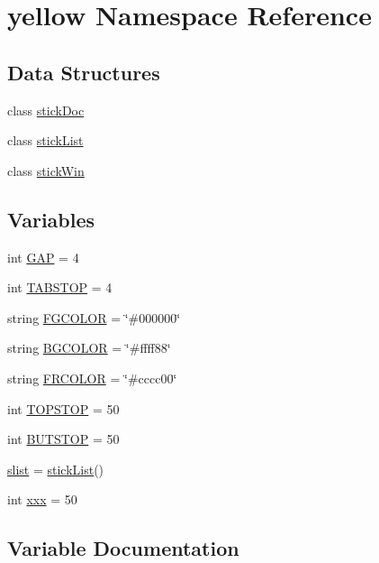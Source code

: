 \hypertarget{namespaceyellow}{}\section{yellow Namespace Reference}
\label{namespaceyellow}
\subsection*{Data Structures}
\begin{DoxyCompactItemize}
\item 
class \hyperlink{classyellow_1_1stick_doc}{stick\+Doc}
\item 
class \hyperlink{classyellow_1_1stick_list}{stick\+List}
\item 
class \hyperlink{classyellow_1_1stick_win}{stick\+Win}
\end{DoxyCompactItemize}
\subsection*{Variables}
\begin{DoxyCompactItemize}
\item 
int \hyperlink{namespaceyellow_ab9f00ec98f2f4c985581d76b371229e0}{G\+AP} = 4
\item 
int \hyperlink{namespaceyellow_a412505a7c4dfda4199a0bfa56a31c705}{T\+A\+B\+S\+T\+OP} = 4
\item 
string \hyperlink{namespaceyellow_a90bafaf9769c30b038b453cfd2345418}{F\+G\+C\+O\+L\+OR} = \char`\"{}\#000000\char`\"{}
\item 
string \hyperlink{namespaceyellow_a58fae5326832d4e160f5281bbb193671}{B\+G\+C\+O\+L\+OR} = \char`\"{}\#ffff88\char`\"{}
\item 
string \hyperlink{namespaceyellow_a93ee0654f5807f448c08e45cfe95ac5f}{F\+R\+C\+O\+L\+OR} = \char`\"{}\#cccc00\char`\"{}
\item 
int \hyperlink{namespaceyellow_a94c6cf79e5db468b17af23a957902f1b}{T\+O\+P\+S\+T\+OP} = 50
\item 
int \hyperlink{namespaceyellow_adf7fb13a8c2e3399426e3476bd4b8838}{B\+U\+T\+S\+T\+OP} = 50
\item 
\hyperlink{namespaceyellow_a76e8fe0652ad593ec2bbcb34c0c61292}{slist} = \hyperlink{classyellow_1_1stick_list}{stick\+List}()
\item 
int \hyperlink{namespaceyellow_a44ee28e60b21e71157cc5932b65edb04}{xxx} = 50
\end{DoxyCompactItemize}


\subsection{Variable Documentation}
\mbox{\label{namespaceyellow_a58fae5326832d4e160f5281bbb193671}} 
